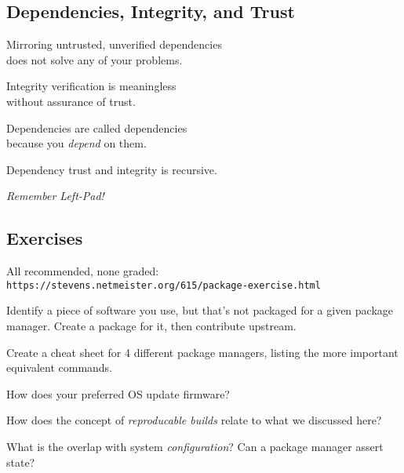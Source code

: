 \documentclass[xga]{xdvislides}
\begin{document}
\subsection{Dependencies, Integrity, and Trust}
\begin{center}
Mirroring untrusted, unverified dependencies\\
does not solve any of your problems. \\
\vspace{.5in}

Integrity verification is meaningless \\
without assurance of trust. \\
\vspace{.5in}

Dependencies are called dependencies \\
because you {\em depend} on them. \\
\vspace{.5in}

Dependency trust and integrity is recursive. \\
\vspace{.5in}

{\em Remember Left-Pad!}
\end{center}

\subsection{Exercises}
All recommended, none graded: \\
\verb+https://stevens.netmeister.org/615/package-exercise.html+

\vspace{.25in}
Identify a piece of software you use, but that's not
packaged for a given package manager.  Create a
package for it, then contribute upstream.

\vspace{.25in}
Create a cheat sheet for 4 different package managers,
listing the more important equivalent commands.

\vspace{.25in}
How does your preferred OS update firmware?

\vspace{.25in}
How does the concept of {\em reproducable builds}
relate to what we discussed here?

\vspace{.25in}
What is the overlap with system {\em configuration}? Can a
package manager assert state?
\end{document}
